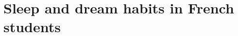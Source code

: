 \cleardoublepage

\chapter{Sleep and dream habits in French students}
\label{res:survey}

\cleardoublepage

% 
